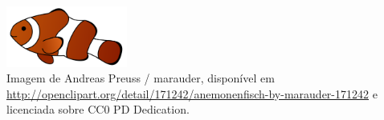 % 

\includegraphics[height=2cm]{figures/anemonenfisch.png} \\
Imagem de Andreas Preuss / marauder, dispon\'{i}vel em \url{http://openclipart.org/detail/171242/anemonenfisch-by-marauder-171242} e licenciada sobre CC0 PD Dedication.
